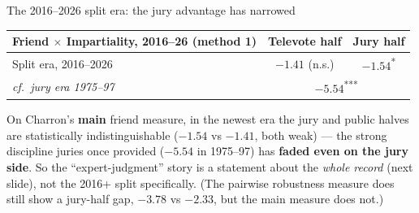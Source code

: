 \documentclass[aspectratio=169,10pt]{beamer}
\newcommand{\spl}[1]{{\color{splitcol}#1}}
\newcommand{\sg}[1]{\textsuperscript{#1}}
\begin{document}
\begin{frame}{The 2016--2026 split era: the jury advantage has narrowed}
  \centering\small
  \renewcommand{\arraystretch}{1.25}
  \begin{tabular}{@{}l c c@{}}
    \toprule
    \textbf{Friend $\times$ Impartiality}, 2016--26 (\textbf{method 1}) & \spl{Televote half} & \color{jurycol}Jury half\\
    \midrule
    \rowcolor{yellow!25}
    Split era, 2016--2026 & \spl{$-1.41$} (n.s.) & \color{jurycol}$-1.54$\sg{*}\\
    \midrule
    \textit{cf.\ jury era 1975--97} & \multicolumn{2}{c}{\color{jurycol}$-5.54$\sg{***}}\\
    \bottomrule
  \end{tabular}

  \vspace{6pt}
  \footnotesize
  On Charron's \textbf{main} friend measure, in the newest era the jury and public halves
  are \colorbox{yellow!25}{statistically indistinguishable} ($-1.54$ vs $-1.41$, both
  weak) --- the strong discipline juries once provided ($-5.54$ in 1975--97) has
  \textbf{faded even on the jury side}. So the ``expert-judgment'' story is a statement
  about the \emph{whole record} (next slide), not the 2016+ split specifically.
  \footnotesize (The pairwise robustness measure does still show a jury-half gap,
  $-3.78$ vs $-2.33$, but the main measure does not.)
\end{frame}
\end{document}

